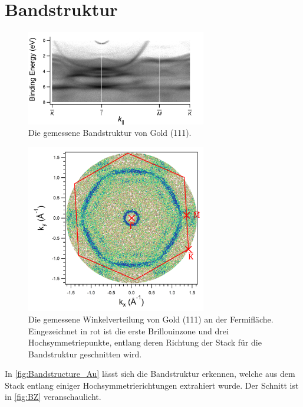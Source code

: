     \section{Bandstruktur}
        \begin{figure}
            \centering
            \includegraphics[width=0.7\textwidth]{./content/pictures/Bandstructure_Au111.png}
            \caption{Die gemessene Bandstruktur von Gold (111).}
            \label{fig:Bandstructure_Au}
        \end{figure}
        \begin{figure}
            \centering
            \includegraphics[width=0.7\textwidth]{./content/pictures/BZ}
            \caption{Die gemessene Winkelverteilung von Gold (111) an der Fermifläche.
            Eingezeichnet in rot ist die erste Brillouinzone und drei Hochsymmetriepunkte, entlang deren Richtung der Stack für die Bandstruktur geschnitten wird.}
            \label{fig:BZ}
        \end{figure}
        In \autoref{fig:Bandstructure_Au} lässt sich die Bandstruktur erkennen, welche aus dem Stack entlang einiger Hochsymmetrierichtungen extrahiert wurde.
        Der Schnitt ist in \autoref{fig:BZ} veranschaulicht.


